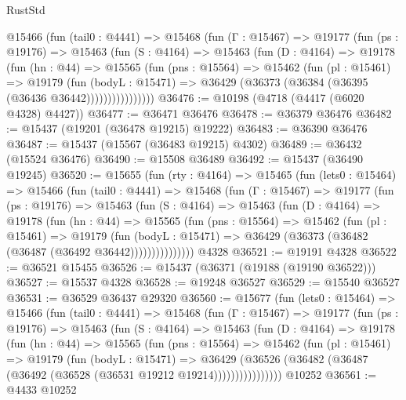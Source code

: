 \begin{lexlean}{RustStd}
\begin{coremodule}
        @15466
          (fun (tail0 : @4441) =>
          @15468
            (fun (Γ : @15467) =>
            @19177
              (fun (ps : @19176) =>
              @15463
                (fun (S : @4164) =>
                @15463
                  (fun (D : @4164) =>
                  @19178
                    (fun (hn : @44) =>
                    @15565
                      (fun (pns : @15564) =>
                      @15462
                        (fun (pl : @15461) =>
                        @19179
                          (fun (bodyL : @15471) =>
                          @36429 (@36373 (@36384 (@36395 (@36436 @36442))))))))))))))))
@36476 := @10198 (@4718 (@4417 (@6020 @4328) @4427))
@36477 := @36471 @36476
@36478 := @36379 @36476
@36482 := @15437 (@19201 (@36478 @19215) @19222)
@36483 := @36390 @36476
@36487 := @15437 (@15567 (@36483 @19215) @4302)
@36489 := @36432 (@15524 @36476)
@36490 := @15508 @36489
@36492 := @15437 (@36490 @19245)
@36520 := @15655
    (fun (rty : @4164) =>
    @15465
      (fun (lets0 : @15464) =>
      @15466
        (fun (tail0 : @4441) =>
        @15468
          (fun (Γ : @15467) =>
          @19177
            (fun (ps : @19176) =>
            @15463
              (fun (S : @4164) =>
              @15463
                (fun (D : @4164) =>
                @19178
                  (fun (hn : @44) =>
                  @15565
                    (fun (pns : @15564) =>
                    @15462
                      (fun (pl : @15461) =>
                      @19179
                        (fun (bodyL : @15471) =>
                        @36429 (@36373 (@36482 (@36487 (@36492 @36442)))))))))))))))
    @4328
@36521 := @19191 @4328
@36522 := @36521 @15455
@36526 := @15437 (@36371 (@19188 (@19190 @36522)))
@36527 := @15537 @4328
@36528 := @19248 @36527
@36529 := @15540 @36527
@36531 := @36529 @36437 @29320
@36560 := @15677
    (fun (lets0 : @15464) =>
    @15466
      (fun (tail0 : @4441) =>
      @15468
        (fun (Γ : @15467) =>
        @19177
          (fun (ps : @19176) =>
          @15463
            (fun (S : @4164) =>
            @15463
              (fun (D : @4164) =>
              @19178
                (fun (hn : @44) =>
                @15565
                  (fun (pns : @15564) =>
                  @15462
                    (fun (pl : @15461) =>
                    @19179
                      (fun (bodyL : @15471) =>
                      @36429
                        (@36526
                          (@36482 (@36487 (@36492 (@36528 (@36531 @19212 @19214))))))))))))))))
    @10252
@36561 := @4433 @10252

\end{coremodule}
\end{lexlean}
